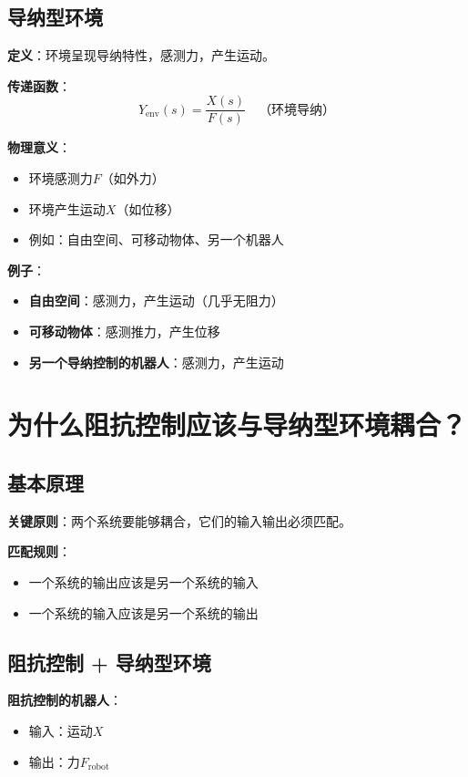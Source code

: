 \documentclass[12pt,a4paper]{article}
\begin{document}
\subsection{导纳型环境}

\textbf{定义}：环境呈现导纳特性，感测力，产生运动。

\textbf{传递函数}：
\begin{equation}
Y_{\text{env}}(s) = \frac{X(s)}{F(s)} \quad \text{（环境导纳）}
\end{equation}

\textbf{物理意义}：
\begin{itemize}
\item 环境感测力$F$（如外力）
\item 环境产生运动$X$（如位移）
\item 例如：自由空间、可移动物体、另一个机器人
\end{itemize}

\textbf{例子}：
\begin{itemize}
\item \textbf{自由空间}：感测力，产生运动（几乎无阻力）
\item \textbf{可移动物体}：感测推力，产生位移
\item \textbf{另一个导纳控制的机器人}：感测力，产生运动
\end{itemize}

\section{为什么阻抗控制应该与导纳型环境耦合？}

\subsection{基本原理}

\textbf{关键原则}：两个系统要能够耦合，它们的输入输出必须匹配。

\textbf{匹配规则}：
\begin{itemize}
\item 一个系统的输出应该是另一个系统的输入
\item 一个系统的输入应该是另一个系统的输出
\end{itemize}

\subsection{阻抗控制 + 导纳型环境}

\textbf{阻抗控制的机器人}：
\begin{itemize}
\item 输入：运动$X$
\item 输出：力$F_{\text{robot}}$
\end{itemize}
\end{document}
